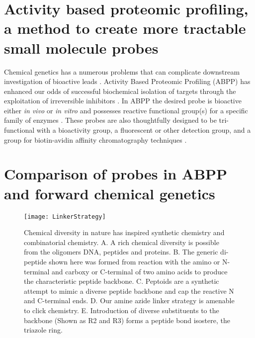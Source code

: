 \section{Activity based proteomic profiling, a method to create more tractable small molecule probes}

Chemical genetics has a numerous problems that can complicate downstream investigation of bioactive leads \cite{burdine2004target}. Activity Based Proteomic Profiling (ABPP) has enhanced our odds of successful biochemical isolation of targets through the exploitation of irreversible inhibitors \cite{saghatelian2005assignment}. In ABPP the desired probe is bioactive either {\it in vivo} or {\it in vitro} and possesses reactive functional group(s) for a specific family of enzymes \cite{adibekian2011click}. These probes are also thoughtfully designed to be tri-functional with a bioactivity group, a fluorescent or other detection group, and a group for biotin-avidin affinity chromatography techniques \cite{walsh2006chemical}.


\section{Comparison of probes in ABPP and forward chemical genetics}

\begin{figure}
\texttt{[image: LinkerStrategy]}
\caption{Chemical diversity in nature has inspired synthetic chemistry and combinatorial chemistry. A. A rich chemical diversity is possible from the oligomers DNA, peptides and proteins. B. The generic di-peptide shown here was formed from reaction with the amino or N-terminal and carboxy or C-terminal of two amino acids to produce the characteristic peptide backbone. C. Peptoids are a synthetic attempt to mimic a diverse peptide backbone and cap the reactive N and C-terminal ends. D. Our amine azide linker strategy is amenable to click chemistry. E. Introduction of diverse substituents to the backbone (Shown as R2 and R3) forms a peptide bond isostere, the triazole ring.}
\label{fig:CombiChemfromOligomers}
\end{figure}

